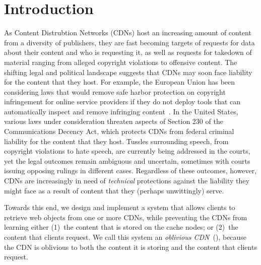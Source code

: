 \section{Introduction}
\label{sec:intro}


As Content Distrubtion Networks (CDNs) host an increasing amount of content
from a diversity of publishers, they are fast becoming targets of requests for
data about their content and who is requesting it, as well as requests for
takedown of material ranging from alleged copyright violations to offensive
content. The shifting legal and political landscape suggests that CDNs may
soon face liability for the content that they host. For example, the European
Union has been considering laws that would remove safe harbor protection on
copyright infringement for online service providers if they do not deploy
tools that can automatically inspect and remove infringing content~\cite{eu-
copyright}.  In the United States, various laws under consideration threaten
aspects of Section 230 of the Communications Decency Act, which protects CDNs
from federal criminal liability for the content that they host. Tussles
surrounding speech, from copyright violations to hate speech, are currently
being addressed in the courts, yet the legal outcomes remain ambiguous and
uncertain, sometimes with courts issuing opposing rulings in different cases.
Regardless of these outcomes, however, CDNs are increasingly in need of {\em technical}
protections against the liability they might face as a result of content that they
(perhaps unwittingly) serve.

Towards this end, we design and implement a system that allows clients to
retrieve web objects from one or more CDNs, while preventing the CDNs from
learning either (1)~the content that is stored on the cache nodes; or (2)~the
content that clients request. We call this system an {\em oblivious
CDN}~(\system{}), because the CDN is oblivious to both the content it is
storing and the content that clients request.

